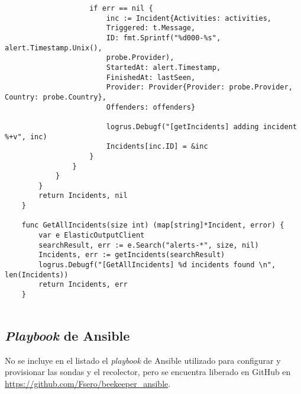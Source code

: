 \begin{verbatim}
                    if err == nil {
                        inc := Incident{Activities: activities,
                        Triggered: t.Message,
                        ID: fmt.Sprintf("%d000-%s", alert.Timestamp.Unix(),
                        probe.Provider),
                        StartedAt: alert.Timestamp,
                        FinishedAt: lastSeen,
                        Provider: Provider{Provider: probe.Provider, Country: probe.Country},
                        Offenders: offenders}

                        logrus.Debugf("[getIncidents] adding incident %+v", inc)
                        Incidents[inc.ID] = &inc
                    }
                }
            }
        }
        return Incidents, nil
    }

    func GetAllIncidents(size int) (map[string]*Incident, error) {
        var e ElasticOutputClient
        searchResult, err := e.Search("alerts-*", size, nil)
        Incidents, err := getIncidents(searchResult)
        logrus.Debugf("[GetAllIncidents] %d incidents found \n", len(Incidents))
        return Incidents, err
    }


\end{verbatim}

\subsection{\emph{Playbook} de Ansible}
\label{subsec:playbook-ansible}

No se incluye en el listado el \emph{playbook} de Ansible utilizado para configurar y provisionar las sondas y el recolector, pero se encuentra liberado en GitHub
en \href{https://github.com/Fsero/beekeeper\_ansible}{https://github.com/Fsero/beekeeper\_ansible}.

